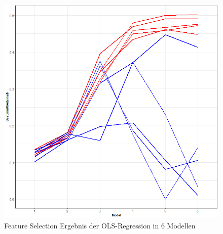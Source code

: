 \documentclass[a4paper,12pt]{thesis}
\begin{document}
\begin{figure}[!ht]
	\centering
	\includegraphics[width=\textwidth]{Plots/plot30.png}
	\caption{Feature Selection  Ergebnis der OLS-Regression in 6 Modellen}
	\label{OLS_ModelSelection}
\end{figure}
\end{document}
